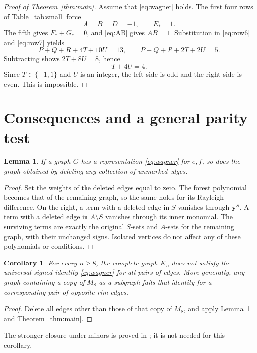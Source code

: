 \documentclass[11pt,a4paper]{article}
\newtheorem{lemma}[theorem]{Lemma}
\newtheorem{corollary}[theorem]{Corollary}
\begin{document}
\begin{proof}[Proof of Theorem~\ref{thm:main}]
Assume that \eqref{eq:wagner} holds. The first four rows of
Table~\ref{tab:small} force
\[
 A=B=D=-1,\qquad E_*=1.
\]
The fifth gives $F_*+G_*=0$, and \eqref{eq:AB} gives $AB=1$.
Substitution in \eqref{eq:row6} and \eqref{eq:row7} yields
\[
 P+Q+R+4T+10U=13,\qquad
 P+Q+R+2T+2U=5.
\]
Subtracting shows $2T+8U=8$, hence
\begin{equation}\label{eq:contradiction}
 \boxed{T+4U=4.}
\end{equation}
Since $T\in\{-1,1\}$ and $U$ is an integer, the left side is odd
and the right side is even. This is impossible.
\end{proof}

\section{Consequences and a general parity test}

\begin{lemma}\label{lem:deletion}
If a graph $G$ has a representation \eqref{eq:wagner} for $e,f$, so
does the graph obtained by deleting any collection of unmarked edges.
\end{lemma}
\begin{proof}
Set the weights of the deleted edges equal to zero. The forest
polynomial becomes that of the remaining graph, so the same holds
for its Rayleigh difference. On the right, a term with a deleted
edge in $S$ vanishes through $\boldsymbol y^S$. A term with a deleted
edge in $A\setminus S$ vanishes through its inner monomial. The
surviving terms are exactly the original $S$-sets and $A$-sets
for the remaining graph, with their unchanged signs. Isolated
vertices do not affect any of these polynomials or conditions.
\end{proof}

\begin{corollary}\label{cor:complete}
For every $n\ge8$, the complete graph $K_n$ does not satisfy the
universal signed identity \eqref{eq:wagner} for all pairs of edges.
More generally, any graph containing a copy of $M_8$ as a subgraph
fails that identity for a corresponding pair of opposite rim edges.
\end{corollary}
\begin{proof}
Delete all edges other than those of that copy of $M_8$, and apply
Lemma~\ref{lem:deletion} and Theorem~\ref{thm:main}.
\end{proof}
The stronger closure under minors is proved in
\cite[Lemma~2.1]{Erickson2012}; it is not needed for this corollary.
\end{document}
